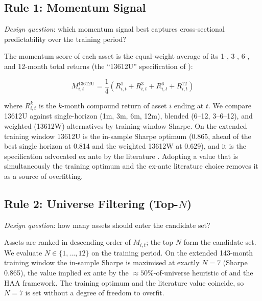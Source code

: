 \subsection{Rule 1: Momentum Signal}
\label{sec:signal}

\textit{Design question}: which momentum signal best captures cross-sectional
predictability over the training period?

The momentum score of each asset is the equal-weight average of its 1-, 3-, 6-,
and 12-month total returns (the ``13612U'' specification of \citealp{keller2017}):

\begin{equation}
M_{i,t}^{\text{13612U}} = \frac{1}{4}\left(R_{i,t}^{1} + R_{i,t}^{3} + R_{i,t}^{6} + R_{i,t}^{12}\right)
\label{eq:momentum}
\end{equation}

where $R_{i,t}^{k}$ is the $k$-month compound return of asset $i$ ending at $t$.
We compare 13612U against single-horizon (1m, 3m, 6m, 12m), blended (6--12,
3--6--12), and weighted (13612W) alternatives by training-window Sharpe.
On the extended training window 13612U is the in-sample Sharpe optimum
(0.865, ahead of the best single horizon at 0.814 and the weighted 13612W at
0.629), and it is the specification advocated ex ante by the literature
\citep{moskowitz2012, asness2013, keller2017}. Adopting a value that is
simultaneously the training optimum and the ex-ante literature choice removes it as
a source of overfitting.

\subsection{Rule 2: Universe Filtering (Top-$N$)}
\label{sec:topn}

\textit{Design question}: how many assets should enter the candidate set?

Assets are ranked in descending order of $M_{i,t}$; the top $N$ form the
candidate set. We evaluate $N \in \{1,\ldots,12\}$ on the training period.
On the extended 143-month training window the in-sample Sharpe is maximised at
exactly $N = 7$ (Sharpe 0.865), the value implied ex ante by the
$\approx 50\%$-of-universe heuristic of \citet{faber2007} and the
\citet{keller2017} HAA framework. The training optimum and the literature value
coincide, so $N = 7$ is set without a degree of freedom to overfit.

